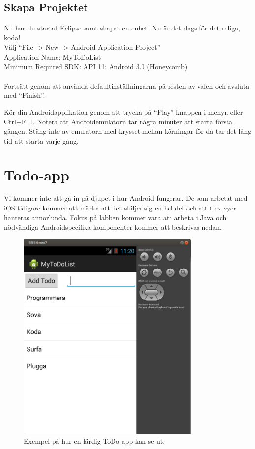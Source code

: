 \documentclass[11 pt, titlepage]{article} %
\begin{document}
\subsection{Skapa Projektet}
Nu har du startat Eclipse samt skapat en enhet. 
Nu är det dags för det roliga, koda!
\\
Välj “File -> New -> Android Application Project”\\ 
Application Name:  MyToDoList\\
Minimum Required SDK:  API 11: Android 3.0 (Honeycomb)\\
\\
Fortsätt genom att använda defaultinställningarna på resten av valen och avsluta med “Finish”. 

Kör din Androidapplikation genom att trycka på “Play” knappen i menyn eller Ctrl+F11. 
Notera att Androidemulatorn tar några minuter att starta första gången. 
Stäng inte av emulatorn med krysset mellan körningar för då tar det lång tid att starta varje gång.

\section{Todo-app}
Vi kommer inte att gå in på djupet i hur Android fungerar. 
De som arbetat med iOS tidigare kommer att märka att det skiljer sig en hel del och att t.ex vyer hanteras annorlunda. 
Fokus på labben kommer vara att arbeta i Java och nödvändiga Androidspecifika komponenter kommer att beskrivas nedan.
\begin{figure}[ht!]
\centering
\includegraphics[width=90mm]{images/app.png}
\caption{Exempel på hur en färdig ToDo-app kan se ut.}
\label{overflow}
\end{figure}
\end{document}
